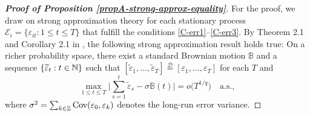 \begin{proof}[\textnormal{\textbf{Proof of Proposition \ref{propA-strong-approx-equality}}}] 
For the proof, we draw on strong approximation theory for each stationary process $\mathcal{E}_i = \{\varepsilon_{it}: 1 \leq t \leq T\}$ that fulfill the conditions \ref{C-err1}--\ref{C-err3}. By Theorem 2.1 and Corollary 2.1 in \cite{BerkesLiuWu2014}, the following strong approximation result holds true: On a richer probability space, there exist a standard Brownian motion $\mathbb{B}$ and a sequence $\{ \widetilde{\varepsilon}_{t}: t \in \mathbb{N} \}$ such that $[\widetilde{\varepsilon}_{1},\ldots,\widetilde{\varepsilon}_{T}] \stackrel{\mathcal{D}}{=} [\varepsilon_{1},\ldots,\varepsilon_{T}]$ for each $T$ and 
\begin{equation}\label{eq-strongapprox-dep}
\max_{1 \le t \le T} \Big| \sum\limits_{s=1}^t \widetilde{\varepsilon}_{s} - \sigma \mathbb{B}(t) \Big| = o\big( T^{1/q} \big) \quad \text{a.s.},  
\end{equation}
where $\sigma^2 = \sum_{k \in \mathbb{Z}} \textnormal{Cov}(\varepsilon_{0}, \varepsilon_{k})$ denotes the long-run error variance.


\end{proof}
